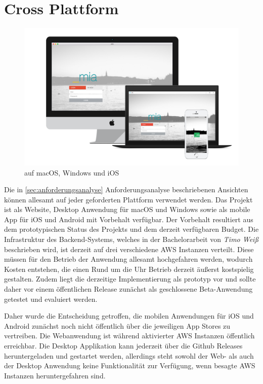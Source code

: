 \newpage

\section{Cross Plattform}

\begin{figure}[h]
 \centering
  \includegraphics[width=1\linewidth]{kapitel5/showcase.png}
 \caption{\projectname{} auf macOS, Windows und iOS}
 \label{kapitel5/cross}
\end{figure}
\vspace{0.3cm}

\noindent Die in \ref{sec:anforderungsanalyse} Anforderungsanalyse beschriebenen Ansichten können allesamt auf jeder geforderten Plattform verwendet werden.
Das Projekt \projectname{} ist als Website, Desktop Anwendung für macOS und Windows sowie als mobile App für iOS und Android mit Vorbehalt verfügbar.
Der Vorbehalt resultiert aus dem prototypischen Status des Projekts und dem derzeit verfügbaren Budget.
Die Infrastruktur des Backend-Systems, welches in der Bachelorarbeit von \emph{Timo Weiß} beschrieben wird,
ist derzeit auf drei verschiedene \ac{AWS} Instanzen verteilt. Diese müssen für den Betrieb der Anwendung allesamt
hochgefahren werden, wodurch Kosten entstehen, die einen Rund um die Uhr Betrieb derzeit äußerst kostspielig gestalten.
Zudem liegt die derzeitige Implementierung als prototyp vor und sollte daher vor einem
öffentlichen Release zunächst als geschlossene Beta-Anwendung getestet und evaluiert werden.

Daher wurde die Entscheidung getroffen, die mobilen Anwendungen für iOS und Android zunächst noch nicht öffentlich über die jeweiligen App Stores zu vertreiben.
Die Webanwendung ist während aktivierter \ac{AWS} Instanzen öffentlich erreichbar.
Die Desktop Applikation kann jederzeit über die Github Releases heruntergeladen und gestartet werden,
allerdings steht sowohl der Web- als auch der Desktop Anwendung keine Funktionalität zur Verfügung, wenn besagte \ac{AWS}
Instanzen heruntergefahren sind.


